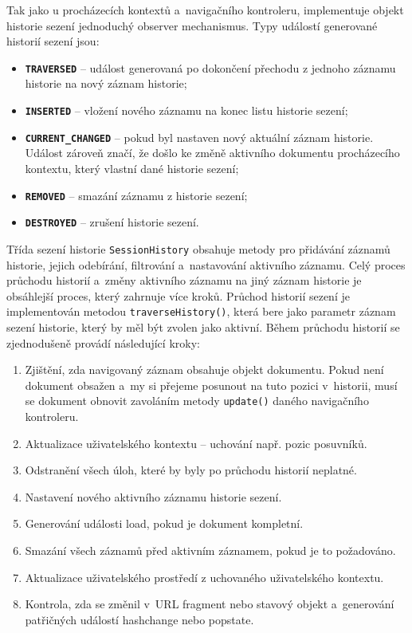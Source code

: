 Tak jako u procházecích kontextů a~navigačního kontroleru, implementuje objekt historie sezení jednoduchý observer mechanismus. Typy událostí generované historií sezení jsou:

\begin{itemize}
  \item \textbf{\texttt{TRAVERSED}} -- událost generovaná po dokončení přechodu z jednoho záznamu historie na nový záznam historie;
  \item \textbf{\texttt{INSERTED}} -- vložení nového záznamu na konec listu historie sezení;
  \item \textbf{\texttt{CURRENT\_CHANGED}} -- pokud byl nastaven nový aktuální záznam historie. Událost zároveň značí, že došlo ke změně aktivního dokumentu procházecího kontextu, který vlastní dané historie sezení; 
  \item \textbf{\texttt{REMOVED}} -- smazání záznamu z historie sezení;
  \item \textbf{\texttt{DESTROYED}} -- zrušení historie sezení.
\end{itemize}

Třída sezení historie \texttt{SessionHistory} obsahuje metody pro přidávání záznamů historie, jejich odebírání, filtrování a~nastavování aktivního záznamu. Celý proces průchodu historií a~změny aktivního záznamu na jiný záznam historie je obsáhlejší proces, který zahrnuje více kroků. Průchod historií sezení je implementován metodou \texttt{traverseHistory()}, která bere jako parametr záznam sezení historie, který by měl být zvolen jako aktivní. Během průchodu historií se zjednodušeně provádí následující kroky:

\begin{enumerate}
  \item Zjištění, zda navigovaný záznam obsahuje objekt dokumentu. Pokud není dokument obsažen a~my si přejeme posunout na tuto pozici v~historii, musí se dokument obnovit zavoláním metody \texttt{update()} daného navigačního kontroleru.
  \item Aktualizace uživatelského kontextu -- uchování např. pozic posuvníků.
  \item Odstranění všech úloh, které by byly po průchodu historií neplatné.
  \item Nastavení nového aktivního záznamu historie sezení.
  \item Generování události load, pokud je dokument kompletní.
  \item Smazání všech záznamů před aktivním záznamem, pokud je to požadováno.
  \item Aktualizace uživatelského prostředí z uchovaného uživatelského kontextu.
  \item Kontrola, zda se změnil v~URL fragment nebo stavový objekt a~generování patřičných událostí hashchange nebo popstate.
\end{enumerate}

